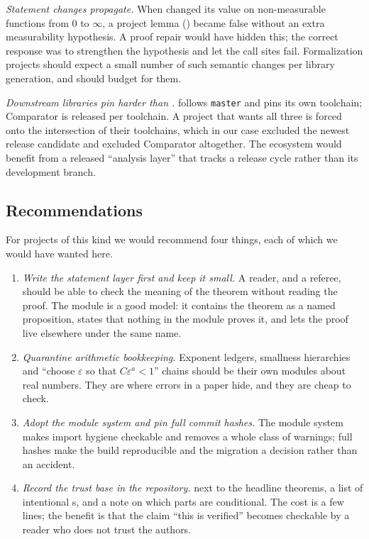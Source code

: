 \emph{Statement changes propagate.} When  changed its value on
non-measurable functions from $0$ to $\infty$, a project lemma
() became false without an extra measurability
hypothesis. A proof repair would have hidden this; the correct response was to strengthen the
hypothesis and let the call sites fail. Formalization projects should expect a small number of
such semantic changes per library generation, and should budget for them.

\emph{Downstream libraries pin harder than \Mathlib{}.} \TauCeti{} follows \Mathlib{}
\texttt{master} and pins its own toolchain; Comparator is released per toolchain. A project
that wants all three is forced onto the intersection of their toolchains, which in our case
excluded the newest \Mathlib{} release candidate and excluded Comparator altogether. The
ecosystem would benefit from a released ``analysis layer'' that tracks a \Mathlib{} release
cycle rather than its development branch.

\subsection{Recommendations}

For projects of this kind we would recommend four things, each of which we would have wanted
here.

\begin{enumerate}
\item \emph{Write the statement layer first and keep it small.} A reader, and a referee,
      should be able to check the meaning of the theorem without reading the proof. The
      module  is a good model: it contains the
      theorem as a named proposition, states that nothing in the module proves it, and lets
      the proof live elsewhere under the same name.
\item \emph{Quarantine arithmetic bookkeeping.} Exponent ledgers, smallness hierarchies and
      ``choose $\varepsilon$ so that $C\varepsilon^a<1$'' chains should be their own modules
      about real numbers. They are where errors in a paper hide, and they are cheap to check.
\item \emph{Adopt the module system and pin full commit hashes.} The module system makes
      import hygiene checkable and removes a whole class of warnings; full hashes make the
      build reproducible and the migration a decision rather than an accident.
\item \emph{Record the trust base in the repository.}  next to the
      headline theorems, a list of intentional s, and a note on which parts are
      conditional. The cost is a few lines; the benefit is that the claim ``this is verified''
      becomes checkable by a reader who does not trust the authors.
\end{enumerate}
